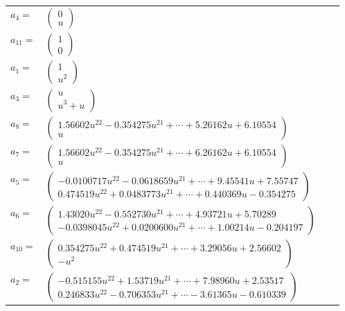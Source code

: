 \documentclass[1p]{elsarticle_modified}
\theoremstyle{definition}
\begin{document}
\begin{tabular}{m{7pt} m{180pt} m{7pt} m{180pt} }
\flushright $a_{4}=$&$\begin{pmatrix}0\\u\end{pmatrix}$ \\
\flushright $a_{11}=$&$\begin{pmatrix}1\\0\end{pmatrix}$ \\
\flushright $a_{1}=$&$\begin{pmatrix}1\\u^2\end{pmatrix}$ \\
\flushright $a_{3}=$&$\begin{pmatrix}u\\u^3+u\end{pmatrix}$ \\
\flushright $a_{8}=$&$\begin{pmatrix}1.56602 u^{22}-0.354275 u^{21}+\cdots+5.26162 u+6.10554\\u\end{pmatrix}$ \\
\flushright $a_{7}=$&$\begin{pmatrix}1.56602 u^{22}-0.354275 u^{21}+\cdots+6.26162 u+6.10554\\u\end{pmatrix}$ \\
\flushright $a_{5}=$&$\begin{pmatrix}-0.0100717 u^{22}-0.0618659 u^{21}+\cdots+9.45541 u+7.55747\\0.474519 u^{22}+0.0483773 u^{21}+\cdots+0.440369 u-0.354275\end{pmatrix}$ \\
\flushright $a_{6}=$&$\begin{pmatrix}1.43020 u^{22}-0.552730 u^{21}+\cdots+4.93721 u+5.70289\\-0.0398045 u^{22}+0.0200600 u^{21}+\cdots+1.00214 u-0.204197\end{pmatrix}$ \\
\flushright $a_{10}=$&$\begin{pmatrix}0.354275 u^{22}+0.474519 u^{21}+\cdots+3.29056 u+2.56602\\- u^2\end{pmatrix}$ \\
\flushright $a_{2}=$&$\begin{pmatrix}-0.515155 u^{22}+1.53719 u^{21}+\cdots+7.98960 u+2.53517\\0.246833 u^{22}-0.706353 u^{21}+\cdots-3.61365 u-0.610339\end{pmatrix}$ \\

\end{tabular}
\end{document}
